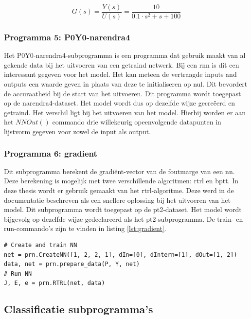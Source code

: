 		\begin{equation}\label{eq:pt2}
			G(s)= \frac{Y(s)}{U(s)} = \frac{10}{0.1 \cdot s^2 + s + 100}	
		\end{equation}
		
		\subsubsection{Programma 5: P0Y0-narendra4}
		Het P0Y0-narendra4-subprogramma is een programma dat gebruik maakt van al gekende data bij het uitvoeren van een getraind netwerk. Bij een \gls{rnn} is dit een interessant gegeven voor het model. Het kan meteen de vertraagde inputs and outputs een waarde geven in plaats van deze te initialiseren op nul. Dit bevordert de accuraatheid bij de start van het uitvoeren. Dit programma wordt toegepast op de narendra4-dataset. Het model wordt dus op dezelfde wijze gecre\"eerd en getraind. Het verschil ligt bij het uitvoeren van het model. Hierbij worden er aan het $NNOut()$ commando drie willekeurig opeenvolgende datapunten in lijstvorm gegeven voor zowel de input als output. 




		\newpage

		\subsubsection{Programma 6: gradient}
		Dit subprogramma berekent de gradi\"ent-vector van de foutmarge van een \gls{nn}. Deze berekening is mogelijk met twee verschillende algoritmen: \gls{rtrl} en \gls{bptt}. In deze thesis wordt er gebruik gemaakt van het \gls{rtrl}-algoritme. Deze werd in de documentatie beschreven als een snellere oplossing bij het uitvoeren van het model. Dit subprogramma wordt toegepast op de pt2-dataset. Het model wordt bijgevolg op dezelfde wijze gedeclareerd als het pt2-subprogramma. De train- en run-commando's zijn te vinden in listing \ref{lst:gradient}.
		
\begin{lstlisting}[caption={Cre\"eren, trainen en runnen van pyrenn-model voor gradient.}, captionpos=b,label={lst:gradient}]
# Create and train NN
net = prn.CreateNN([1, 2, 2, 1], dIn=[0], dIntern=[1], dOut=[1, 2])
data, net = prn.prepare_data(P, Y, net)
# Run NN
J, E, e = prn.RTRL(net, data)
\end{lstlisting}	

	\subsection{Classificatie subprogramma's}
		
